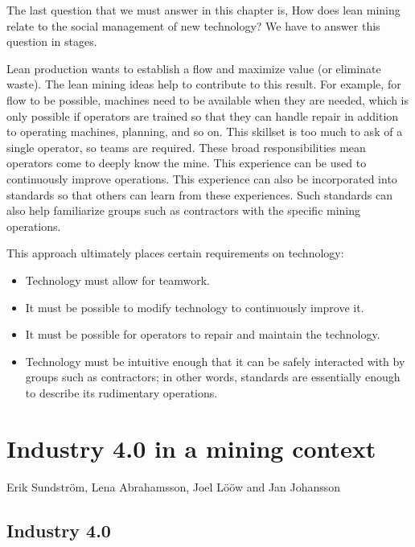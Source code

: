 \documentclass[
  12pt,
]{scrbook}
\providecommand{\tightlist}{%
  \setlength{\itemsep}{0pt}\setlength{\parskip}{0pt}}
\newenvironment{chap-auth}
{\vspace{1cm}\begin{center}\begin{flushright}\sffamily\noindent}
  {\end{flushright}\end{center}\vspace{1cm}}
\begin{document}
The last question that we must answer in this chapter is, How does lean mining relate to the social management of new technology? We have to answer this question in stages.

Lean production wants to establish a flow and maximize value (or eliminate waste). The lean mining ideas help to contribute to this result. For example, for flow to be possible, machines need to be available when they are needed, which is only possible if operators are trained so that they can handle repair in addition to operating machines, planning, and so on. This skillset is too much to ask of a single operator, so teams are required. These broad responsibilities mean operators come to deeply know the mine. This experience can be used to continuously improve operations. This experience can also be incorporated into standards so that others can learn from these experiences. Such standards can also help familiarize groups such as contractors with the specific mining operations.

This approach ultimately places certain requirements on technology:

\begin{itemize}
\tightlist
\item
  Technology must allow for teamwork.
\item
  It must be possible to modify technology to continuously improve it.
\item
  It must be possible for operators to repair and maintain the technology.
\item
  Technology must be intuitive enough that it can be safely interacted with by groups such as contractors; in other words, standards are essentially enough to describe its rudimentary operations.
\end{itemize}

\hypertarget{industry-4.0-in-a-mining-context}{%
\chapter{Industry 4.0 in a mining context}\label{industry-4.0-in-a-mining-context}}

\begin{chap-auth}
Erik Sundström, Lena Abrahamsson, Joel Lööw and Jan Johansson
\end{chap-auth}

\hypertarget{industry-4.0}{%
\section*{Industry 4.0}\label{industry-4.0}}
\end{document}
